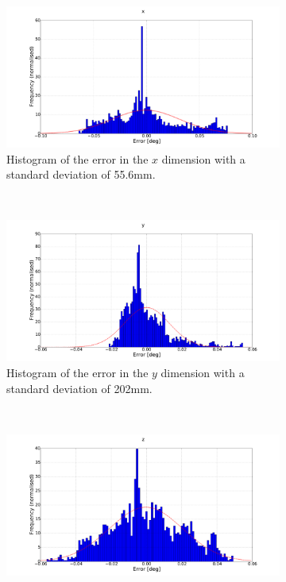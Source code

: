\begin{figure}
  \begin{subfigure}{0.45\textwidth}
     \includegraphics[clip, trim = 150 50 175 0, width=\textwidth]{figures/chapter3/norm_x}
     \caption{Histogram of the error in the $x$ dimension with a standard deviation of 55.6mm.}
  \label{fig:norm-x}
  \end{subfigure}
~
  \begin{subfigure}{0.45\textwidth}
     \includegraphics[clip, trim = 150 50 175 0, width=\textwidth]{figures/chapter3/norm_y}
     \caption{Histogram of the error in the $y$ dimension with a standard deviation of 202mm.}
  \label{fig:norm-y}
  \end{subfigure}
~
  \begin{subfigure}{0.45\textwidth}
     \includegraphics[clip, trim = 150 50 175 0, width=\textwidth]{figures/chapter3/norm_z}

\end{subfigure}
\end{figure}
